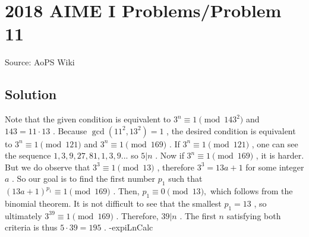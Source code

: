 \documentclass[12pt]{article}
\begin{document}
\section*{{2018 AIME I Problems/Problem 11}}
Source: AoPS Wiki

\subsection*{Solution}
Note that the given condition is equivalent to $3^n \equiv 1 \pmod{143^2}$ and $143=11\cdot 13$ . Because $\gcd(11^2, 13^2) = 1$ , the desired condition is equivalent to $3^n \equiv 1 \pmod{121}$ and $3^n \equiv 1 \pmod{169}$ . If $3^n \equiv 1 \pmod{121}$ , one can see the sequence $1, 3, 9, 27, 81, 1, 3, 9...$ so $5|n$ . Now if $3^n \equiv 1 \pmod{169}$ , it is harder. But we do observe that $3^3 \equiv 1 \pmod{13}$ , therefore $3^3 = 13a + 1$ for some integer $a$ . So our goal is to find the first number $p_1$ such that $(13a+1)^ {p_1} \equiv 1 \pmod{169}$ . Then, $p_1 \equiv 0 \pmod{13},$ which follows from the binomial theorem. It is not difficult to see that the smallest $p_1=13$ , so ultimately $3^{39} \equiv 1 \pmod{169}$ . Therefore, $39|n$ . The first $n$ satisfying both criteria is thus $5\cdot 39=\boxed{195}$ . -expiLnCalc
\end{document}
